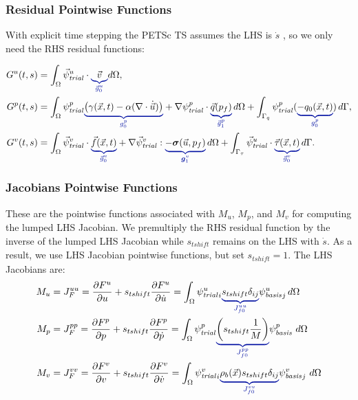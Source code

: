 \subsubsection{Residual Pointwise Functions}

With explicit time stepping the PETSc TS assumes the LHS is $\dot{s}$ , so we only need the RHS residual functions:

\begin{align}
  G^u(t,s) & = \int_{\Omega} \trialvec[u] \cdot \eqnannotate{\vec{v}}{\vec{g}_0^u} d \Omega,                                                                                                                                                                                                   \\
  G^p(t,s) & = \int_\Omega \trialscalar[p] \eqnannotate{\left(\gamma(\vec{x},t) - \alpha (\nabla \cdot \dot{\vec{u}})\right)}{g^p_0} + \nabla \trialscalar[p] \cdot \eqnannotate{\vec{q}(p_f)}{\vec{g}^p_1} \, d\Omega
  + \int_{\Gamma_q} \trialscalar[p] (\eqnannotate{-q_0(\vec{x},t)}{g^p_0}) \, d\Gamma,                                                                                                                                                                                                         \\
  G^v(t,s) & = \int_\Omega \trialvec[v] \cdot \eqnannotate{\vec{f}(\vec{x},t)}{\vec{g}^v_0} + \nabla \trialvec[v] :\eqnannotate{-\tensor{\sigma}(\vec{u},p_f)}{\tensor{g}^v_1} \, d\Omega + \int_{\Gamma_\tau} \trialvec[u] \cdot \eqnannotate{\vec{\tau}(\vec{x},t)}{\vec{g}^v_0} \, d\Gamma.
\end{align}

\subsubsection{Jacobians Pointwise Functions}

These are the pointwise functions associated with $M_{u}$, $M_{p}$,
and $M_{v}$ for computing the lumped LHS Jacobian. We premultiply the
RHS residual function by the inverse of the lumped LHS Jacobian while
$s_\mathit{tshift}$ remains on the LHS with $\dot{s}$. As a result,
we use LHS Jacobian pointwise functions, but set $s_\mathit{tshift} = 1$. The
LHS Jacobians are:
\begin{align}
  M_{u} & = J_F^{uu} = \frac{\partial F^u}{\partial u} + s_{tshift} \frac{\partial F^u}{\partial \dot{u}} =
  \int_{\Omega} \trialscalar[u]_{i} \eqnannotate{s_{tshift} \delta_{ij}}{J^{uu}_{f0}} \basisscalar[u]_{j} \, d \Omega    \\
  M_{p} & = J_F^{pp} = \frac{\partial F^p}{\partial p} + s_{tshift} \frac{\partial F^p}{\partial \dot{p}} =
  \int_{\Omega} \trialscalar[p] \eqnannotate{\left(s_{tshift} \frac{1}{M}\right)}{J_{f0}^{pp}} \basisscalar[p] \ d\Omega \\
  M_{v} & = J_F^{vv} = \frac{\partial F^v}{\partial v} + s_{tshift} \frac{\partial F^v}{\partial \dot{v}} =
  \int_{\Omega} \trialscalar[v]_{i}\eqnannotate{\rho_{b}(\vec{x}) s_{tshift} \delta_{ij}}{J^{vv}_{f0}} \basisscalar[v]_{j} \  d \Omega
\end{align}
